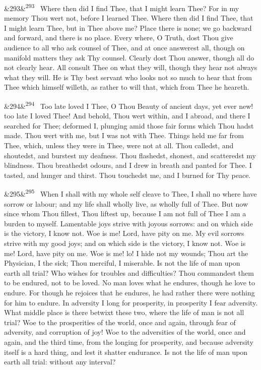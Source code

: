 \documentclass[12pt]{article}
\newcommand{\para}[1][]{\par\noindent\ifx&#1&\else\textsuperscript{\footnotesize #1}~\fi}
\begin{document}
\para[293] Where then did I find Thee, that I might learn Thee? For in my memory Thou wert not, before I learned Thee. Where then did I find Thee, that I might learn Thee, but in Thee above me? Place there is none; we go backward and forward, and there is no place. Every where, O Truth, dost Thou give audience to all who ask counsel of Thee, and at once answerest all, though on manifold matters they ask Thy counsel. Clearly dost Thou answer, though all do not clearly hear. All consult Thee on what they will, though they hear not always what they will. He is Thy best servant who looks not so much to hear that from Thee which himself willeth, as rather to will that, which from Thee he heareth.

\para[294] Too late loved I Thee, O Thou Beauty of ancient days, yet ever new! too late I loved Thee! And behold, Thou wert within, and I abroad, and there I searched for Thee; deformed I, plunging amid those fair forms which Thou hadst made. Thou wert with me, but I was not with Thee. Things held me far from Thee, which, unless they were in Thee, were not at all. Thou calledst, and shoutedst, and burstest my deafness. Thou flashedst, shonest, and scatteredst my blindness. Thou breathedst odours, and I drew in breath and panted for Thee. I tasted, and hunger and thirst. Thou touchedst me, and I burned for Thy peace.

\para[295] When I shall with my whole self cleave to Thee, I shall no where have sorrow or labour; and my life shall wholly live, as wholly full of Thee. But now since whom Thou fillest, Thou liftest up, because I am not full of Thee I am a burden to myself. Lamentable joys strive with joyous sorrows: and on which side is the victory, I know not. Woe is me! Lord, have pity on me. My evil sorrows strive with my good joys; and on which side is the victory, I know not. Woe is me! Lord, have pity on me. Woe is me! lo! I hide not my wounds; Thou art the Physician, I the sick; Thou merciful, I miserable. Is not the life of man upon earth all trial? Who wishes for troubles and difficulties? Thou commandest them to be endured, not to be loved. No man loves what he endures, though he love to endure. For though he rejoices that he endures, he had rather there were nothing for him to endure. In adversity I long for prosperity, in prosperity I fear adversity. What middle place is there betwixt these two, where the life of man is not all trial? Woe to the prosperities of the world, once and again, through fear of adversity, and corruption of joy! Woe to the adversities of the world, once and again, and the third time, from the longing for prosperity, and because adversity itself is a hard thing, and lest it shatter endurance. Is not the life of man upon earth all trial: without any interval?
\end{document}
